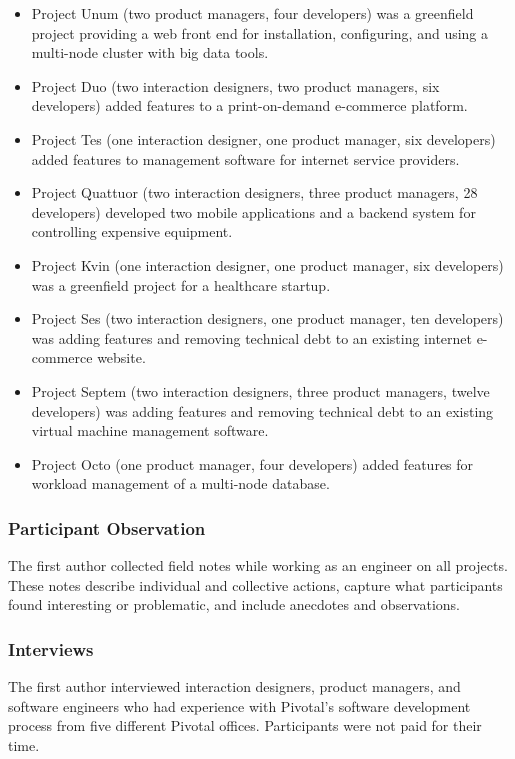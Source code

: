 \begin{itemize}
\item Project Unum (two product managers, four developers) was a greenfield project providing a web front end for installation, configuring, and using a multi-node cluster with big data tools. 
\item Project Duo (two interaction designers, two product managers, six developers) added features to a print-on-demand e-commerce platform. 
\item Project Tes (one interaction designer, one product manager, six developers) added features to management software for internet service providers.
\item Project Quattuor (two interaction designers, three product managers, 28 developers) developed two mobile applications and a backend system for controlling expensive equipment.
\item Project Kvin (one interaction designer, one product manager, six developers) was a greenfield project for a healthcare startup. 
\item Project Ses (two interaction designers, one product manager, ten developers) was adding features and removing technical debt to an existing internet e-commerce website.
\item Project Septem (two interaction designers, three product managers, twelve developers) was adding features and removing technical debt to an existing virtual machine management software.
\item Project Octo (one product manager, four developers) added features for  workload management of a multi-node database.
\end{itemize}
\subsubsection{Participant Observation}
The first author collected field notes while working as an engineer on all \numberOfObservedProjects{} projects. These notes describe individual and collective actions, capture what participants found interesting or problematic, and include anecdotes and observations.
\subsubsection{Interviews}
The first author interviewed \numberOfInterviews{} interaction designers, product managers, and software engineers who had experience with Pivotal's software development process from five different Pivotal offices. Participants were not paid for their time.

